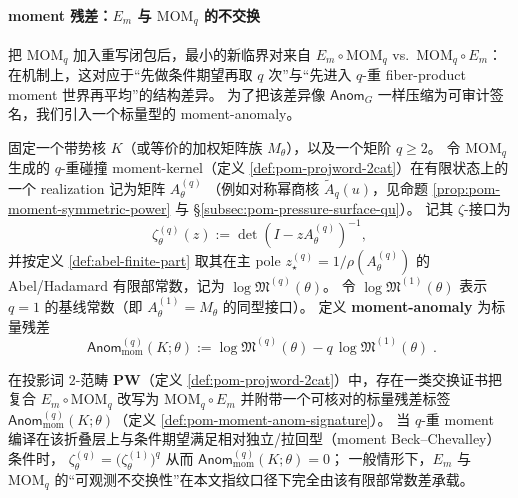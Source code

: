 \paragraph{moment 残差：\texorpdfstring{$E_m$}{Em} 与 \texorpdfstring{$\mathrm{MOM}_q$}{MOMq} 的不交换}
把 \(\mathrm{MOM}_q\) 加入重写闭包后，最小的新临界对来自
\(
E_m\circ \mathrm{MOM}_q
\)
vs.\
\(
\mathrm{MOM}_q\circ E_m
\)：
在机制上，这对应于“先做条件期望再取 \(q\) 次”与“先进入 \(q\)-重 fiber-product moment 世界再平均”的结构差异。
为了把该差异像 \(\mathsf{Anom}_G\) 一样压缩为可审计签名，我们引入一个标量型的 moment-anomaly。

\begin{definition}\label{def:pom-moment-anom-signature}
固定一个带势核 \(K\)（或等价的加权矩阵族 \(M_\theta\)），以及一个矩阶 \(q\ge 2\)。
令 \(\mathrm{MOM}_q\) 生成的 \(q\)-重碰撞 moment-kernel（定义 \ref{def:pom-projword-2cat}）在有限状态上的一个 realization 记为矩阵 \(A^{(q)}_\theta\)
（例如对称幂商核 \(\widetilde A_q(u)\)，见命题 \ref{prop:pom-moment-symmetric-power} 与 \S\ref{subsec:pom-pressure-surface-qu}）。
记其 \(\zeta\)-接口为
\[
\zeta^{(q)}_\theta(z):=\det(I-zA^{(q)}_\theta)^{-1},
\]
并按定义 \ref{def:abel-finite-part} 取其在主 pole \(z_\star^{(q)}=1/\rho(A^{(q)}_\theta)\) 的 Abel/Hadamard 有限部常数，记为 \(\log\mathfrak{M}^{(q)}(\theta)\)。
令 \(\log\mathfrak{M}^{(1)}(\theta)\) 表示 \(q=1\) 的基线常数（即 \(A^{(1)}_\theta=M_\theta\) 的同型接口）。
定义 \textbf{moment-anomaly} 为标量残差
\[
\boxed{\;
\mathsf{Anom}^{(q)}_{\mathrm{mom}}(K;\theta)
:=
\log\mathfrak{M}^{(q)}(\theta)
- q\,\log\mathfrak{M}^{(1)}(\theta)\;}.
\]
\end{definition}

\begin{proposition}\label{prop:pom-em-mom-residual-swap}
在投影词 $2$-范畴 \(\mathbf{PW}\)（定义 \ref{def:pom-projword-2cat}）中，存在一类交换证书把复合
\(
E_m\circ \mathrm{MOM}_q
\)
改写为
\(
\mathrm{MOM}_q\circ E_m
\)
并附带一个可核对的标量残差标签 \(\mathsf{Anom}^{(q)}_{\mathrm{mom}}(K;\theta)\)（定义 \ref{def:pom-moment-anom-signature}）。
当 \(q\)-重 moment 编译在该折叠层上与条件期望满足相对独立/拉回型（moment Beck--Chevalley）条件时，
\(\zeta^{(q)}_\theta=\bigl(\zeta^{(1)}_\theta\bigr)^q\)
从而 \(\mathsf{Anom}^{(q)}_{\mathrm{mom}}(K;\theta)=0\)；
一般情形下，\(E_m\) 与 \(\mathrm{MOM}_q\) 的“可观测不交换性”在本文指纹口径下完全由该有限部常数差承载。
\end{proposition}


